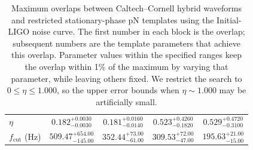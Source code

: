 \begin{table}
\begin{center}
\begin{tabular}{@{}lcccc@{}}
      $\eta$ &
      $0.182^{+0.0030}_{-0.0030}$  &
      $0.181^{+0.0160}_{-0.0140}$  &
      $0.523^{+0.4260}_{-0.1820}$  &
      $0.529^{+0.4720}_{-0.3100}$  \\
      $f_{\mathrm{cut}}$ (Hz) &
      $509.47^{+654.00}_{-145.00}$  &
      $352.44^{+73.00}_{-61.00}$  &
      $309.53^{+72.00}_{-47.00}$  &
      $195.63^{+21.00}_{-15.00}$  \\
      \hline \hline
    \end{tabular}
  \end{center}
  \caption{Maximum overlaps between Caltech--Cornell hybrid waveforms
    and restricted stationary-phase pN templates using the
    Initial-LIGO noise curve.  The first number in each block is the
    overlap; subsequent numbers are the template parameters that
    achieve this overlap.  Parameter values within the specified
    ranges keep the overlap within 1\% of the maximum by varying that
    parameter, while leaving others fixed.  We restrict the search to
    $0 \leq \eta \leq 1.000$, so the upper error bounds when $\eta\sim
    1.000$ may be artificially small.}
  \label{tab:ThreeParamOverlapDetailInitial}
\end{table}

%
%

